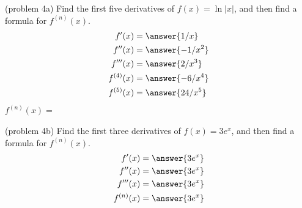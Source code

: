 \documentclass[handout]{ximera}
\begin{document}
\begin{problem}(problem 4a)
Find the first five derivatives of $f(x) = \ln|x|$, and then find a formula for $f^{(n)}(x)$.\\
\begin{align}
f'(x) &= \answer{1/x}\\
f''(x) &= \answer{-1/x^2}\\
f'''(x) &= \answer{2/x^3}\\
f^{(4)}(x) &= \answer{-6/x^4}\\
f^{(5)}(x) &= \answer{24/x^5}\\
\end{align}
$f^{(n)}(x) = $
\begin{multipleChoice}
\end{multipleChoice}

\end{problem}


\begin{problem}(problem 4b)
Find the first three derivatives of $f(x) = 3e^x$, and then find a formula for $f^{(n)}(x)$.\\
\begin{align}
f'(x) &= \answer{3e^x}\\
f''(x) &= \answer{3e^x}\\
f'''(x) &= \answer{3e^x}\\
f^{(n)}(x) &= \answer{3e^x}
\end{align}

\end{problem}
\end{document}
